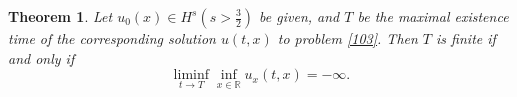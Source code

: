 \documentclass[preprint,12pt]{elsarticle}
\numberwithin{equation}{section}
\newtheorem{theorem}{Theorem}[section]
\begin{document}
\begin{theorem}
\label{the204} Let $u_{0}(x)\in H^{s}(s>\frac{3}{2})$ be given, and
$T$ be the maximal existence time of the corresponding solution $u(t,x)$ to problem \eqref{103}.
Then $T$ is finite if and only if
\begin{equation*}
\liminf_{t\rightarrow T}\inf_{x\in\mathbb{R}}{u_{x}(t,x)}=-\infty.
\end{equation*}
\end{theorem}
\end{document}
